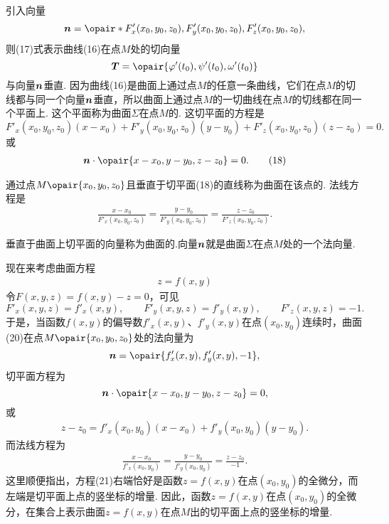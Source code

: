引入向量\begin{equation}
\mat{n}=\opair*{F'_x(x_0,y_0,z_0),F'_y(x_0,y_0,z_0),F'_z(x_0,y_0,z_0)},
\end{equation}则(17)式表示曲线(16)在点\(M\)处的切向量\[
\mat{T} = \opair{\varphi'(t_0),\psi'(t_0),\omega'(t_0)}
\]与向量\(\boldsymbol{n}\)垂直.
因为曲线(16)是曲面上通过点\(M\)的任意一条曲线，它们在点\(M\)的切线都与同一个向量\(\boldsymbol{n}\)垂直，所以曲面上通过点\(M\)的一切曲线在点\(M\)的切线都在同一个平面上.
这个平面称为曲面\(\Sigma\)在点\(M\)的.
这切平面的方程是\[
F'_x(x_0,y_0,z_0) (x-x_0)
+ F'_y(x_0,y_0,z_0) (y-y_0)
+ F'_z(x_0,y_0,z_0) (z-z_0)
= 0.
\]或\begin{gather}
\mat{n}\cdot\opair{x-x_0,y-y_0,z-z_0}=0.
\tag{18}
\end{gather}

通过点\(M\opair{x_0,y_0,z_0}\)且垂直于切平面(18)的直线称为曲面在该点的.
法线方程是\begin{gather}
\frac{x-x_0}{F'_x(x_0,y_0,z_0)}
=\frac{y-y_0}{F'_y(x_0,y_0,z_0)}
=\frac{z-z_0}{F'_z(x_0,y_0,z_0)}.
\tag{19}
\end{gather}

垂直于曲面上切平面的向量称为曲面的.向量\(\boldsymbol{n}\)就是曲面\(\Sigma\)在点\(M\)处的一个法向量.


现在来考虑曲面方程\begin{gather}
z = f(x,y)
\tag{20}
\end{gather}
令\(F(x,y,z)=f(x,y)-z=0\)，可见\[
F'_x(x,y,z) = f'_x(x,y),
\qquad
F'_y(x,y,z) = f'_y(x,y),
\qquad
F'_z(x,y,z) = -1.
\]于是，当函数\(f(x,y)\)的偏导数\(f'_x(x,y)\)、\(f'_y(x,y)\)在点\((x_0,y_0)\)连续时，曲面(20)在点\(M\opair{x_0,y_0,z_0}\)处的法向量为\[
\mat{n}=\opair{f'_x(x,y),f'_y(x,y),-1},
\]切平面方程为\[
\mat{n}\cdot\opair{x-x_0,y-y_0,z-z_0}=0,
\]或\begin{gather}
z-z_0 = f'_x(x_0,y_0) (x-x_0) + f'_y(x_0,y_0) (y-y_0).
\tag{21}
\end{gather}而法线方程为\begin{gather}
\frac{x-x_0}{f'_x(x_0,y_0)}
=\frac{y-y_0}{f'_y(x_0,y_0)}
=\frac{z-z_0}{-1}.
\tag{22}
\end{gather}
这里顺便指出，方程(21)右端恰好是函数\(z = f(x,y)\)在点\((x_0,y_0)\)的全微分，而左端是切平面上点的竖坐标的增量.
因此，函数\(z = f(x,y)\)在点\((x_0,y_0)\)的全微分，在集合上表示曲面\(z = f(x,y)\)在点\(M\)出的切平面上点的竖坐标的增量.

